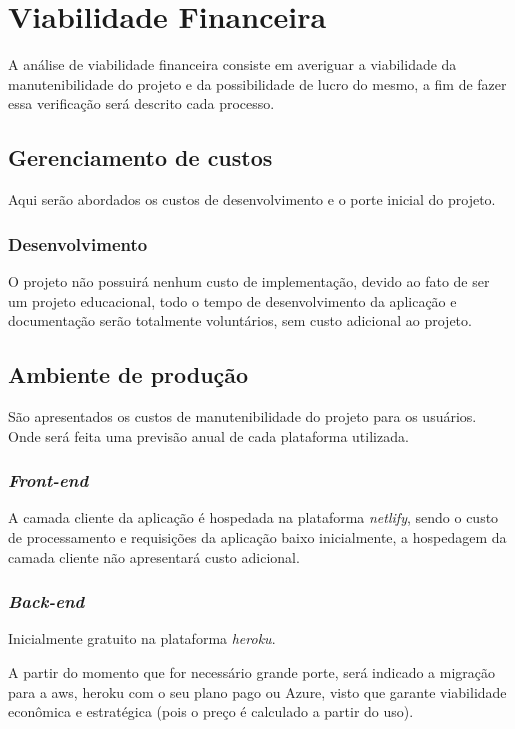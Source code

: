 \section{Viabilidade Financeira}
A análise de viabilidade financeira consiste em averiguar a viabilidade da manutenibilidade do projeto
e da possibilidade de lucro do mesmo, a fim de fazer essa verificação será descrito cada processo.

\subsection{Gerenciamento de custos}
Aqui serão abordados os custos de desenvolvimento e o porte inicial do projeto.

\subsubsection{Desenvolvimento}
O projeto não possuirá nenhum custo de implementação, devido ao fato de ser um projeto educacional,
todo o tempo de desenvolvimento da aplicação e documentação serão totalmente voluntários, sem custo adicional ao projeto.

\subsection{Ambiente de produção}
São apresentados os custos de manutenibilidade do projeto para os usuários. 
Onde será feita uma previsão anual de cada plataforma utilizada.

\subsubsection{\textit{Front-end}}
A camada cliente da aplicação é hospedada na plataforma \textit{\gls{netlify}}, sendo o custo de processamento e requisições da aplicação
baixo inicialmente, a hospedagem da camada cliente não apresentará custo adicional.

\subsubsection{\textit{Back-end}}
Inicialmente gratuito na plataforma \textit{\gls{heroku}}.

A partir do momento que for necessário grande porte, será indicado a migração para a \gls{aws}, \gls{heroku} com o seu plano pago ou Azure,
visto que garante viabilidade econômica e estratégica (pois o
preço é calculado a partir do uso).

